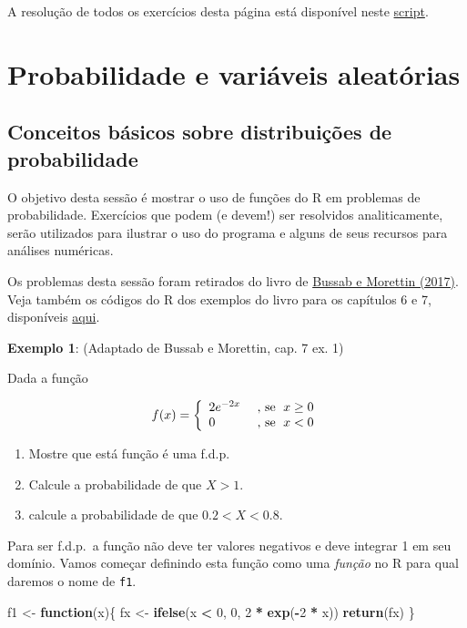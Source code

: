 \documentclass[10pt,a4paper]{book}
\newenvironment{Shaded}{\begin{snugshade}}{\end{snugshade}}
\newcommand{\KeywordTok}[1]{\textcolor[rgb]{0.13,0.29,0.53}{\textbf{#1}}}
\newcommand{\DecValTok}[1]{\textcolor[rgb]{0.00,0.00,0.81}{#1}}
\newcommand{\StringTok}[1]{\textcolor[rgb]{0.31,0.60,0.02}{#1}}
\newcommand{\ControlFlowTok}[1]{\textcolor[rgb]{0.13,0.29,0.53}{\textbf{#1}}}
\newcommand{\OperatorTok}[1]{\textcolor[rgb]{0.81,0.36,0.00}{\textbf{#1}}}
\newcommand{\NormalTok}[1]{#1}
\providecommand{\tightlist}{%
  \setlength{\itemsep}{0pt}\setlength{\parskip}{0pt}}
\begin{document}
A resolução de todos os exercícios desta página está disponível neste
\href{scripts/analise-exploratoria-exercicios.R}{script}.

\chapter{Probabilidade e variáveis
aleatórias}\label{probabilidade-e-variuxe1veis-aleatuxf3rias}

\section{Conceitos básicos sobre distribuições de
probabilidade}\label{conceitos-buxe1sicos-sobre-distribuiuxe7uxf5es-de-probabilidade}

O objetivo desta sessão é mostrar o uso de funções do R em problemas de
probabilidade. Exercícios que podem (e devem!) ser resolvidos
analiticamente, serão utilizados para ilustrar o uso do programa e
alguns de seus recursos para análises numéricas.

Os problemas desta sessão foram retirados do livro de
\href{https://www.ime.usp.br/~pam/EstBas.html}{Bussab e Morettin
(2017)}. Veja também os códigos do R dos exemplos do livro para os
capítulos 6 e 7, disponíveis
\href{https://rpubs.com/EstatBasica/Introd}{aqui}.

\textbf{Exemplo 1}: (Adaptado de Bussab e Morettin, cap. 7 ex. 1)

Dada a função

\[
\
  f(x) = \left\{ \begin{array}{ll}
      2 e^{-2x} & \mbox{ , se $ \; x \geq 0$} \cr
      0   & \mbox{ , se  $ \; x < 0$}
    \end{array} \right.
\
\]

\begin{enumerate}
\def\labelenumi{\alph{enumi}.}
\tightlist
\item
  Mostre que está função é uma f.d.p.
\item
  Calcule a probabilidade de que \(X > 1\).
\item
  calcule a probabilidade de que \(0.2 < X < 0.8\).
\end{enumerate}

Para ser f.d.p.~a função não deve ter valores negativos e deve integrar
1 em seu domínio. Vamos começar definindo esta função como uma
\emph{função} no R para qual daremos o nome de \texttt{f1}.

\begin{Shaded}
\begin{Highlighting}[]
\NormalTok{f1 <-}\StringTok{ }\ControlFlowTok{function}\NormalTok{(x)\{}
\NormalTok{    fx <-}\StringTok{ }\KeywordTok{ifelse}\NormalTok{(x }\OperatorTok{<}\StringTok{ }\DecValTok{0}\NormalTok{, }\DecValTok{0}\NormalTok{, }\DecValTok{2} \OperatorTok{*}\StringTok{ }\KeywordTok{exp}\NormalTok{(}\OperatorTok{-}\DecValTok{2} \OperatorTok{*}\StringTok{ }\NormalTok{x))}
    \KeywordTok{return}\NormalTok{(fx)}
\NormalTok{\}}
\end{Highlighting}
\end{Shaded}
\end{document}
